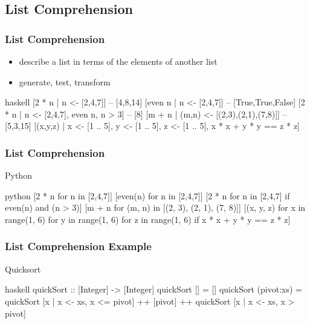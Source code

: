 \documentclass[dvipsnames]{beamer}
\theoremstyle{plain}
\begin{document}
\subsection{List Comprehension}

\begin{frame}[fragile]
  \frametitle{List Comprehension}

  \begin{itemize}
    \item describe a list in terms of the elements of another list
    \item generate, test, transform
  \end{itemize}

  \begin{exampleblock}{}
    \begin{pygments}{haskell}
[2 * n | n <- [2,4,7]]  -- [4,8,14]
[even n | n <- [2,4,7]] -- [True,True,False]
[2 * n | n <- [2,4,7], even n, n > 3]   -- [8]
[m + n | (m,n) <- [(2,3),(2,1),(7,8)]]  -- [5,3,15]
[(x,y,z) | x <- [1 .. 5],
           y <- [1 .. 5],
           z <- [1 .. 5],
           x * x + y * y == z * z]
    \end{pygments}
  \end{exampleblock}
\end{frame}

\begin{frame}[fragile]
  \frametitle{List Comprehension}

  \begin{exampleblock}{Python}
    \begin{pygments}{python}
[2 * n for n in [2,4,7]]
[even(n) for n in [2,4,7]]
[2 * n for n in [2,4,7] if even(n) and (n > 3)]
[m + n for (m, n) in [(2, 3), (2, 1), (7, 8)]]
[(x, y, z) for x in range(1, 6)
           for y in range(1, 6)
           for z in range(1, 6)
           if x * x + y * y == z * z]
    \end{pygments}
  \end{exampleblock}
\end{frame}

\begin{frame}[fragile]
  \frametitle{List Comprehension Example}

  \begin{exampleblock}{Quicksort}
    \begin{pygments}{haskell}
quickSort :: [Integer] -> [Integer]
quickSort [] = []
quickSort (pivot:xs) =
    quickSort [x | x <- xs, x <= pivot]
    ++ [pivot]
    ++ quickSort [x | x <- xs, x > pivot]
    \end{pygments}
  \end{exampleblock}
\end{frame}
\end{document}
